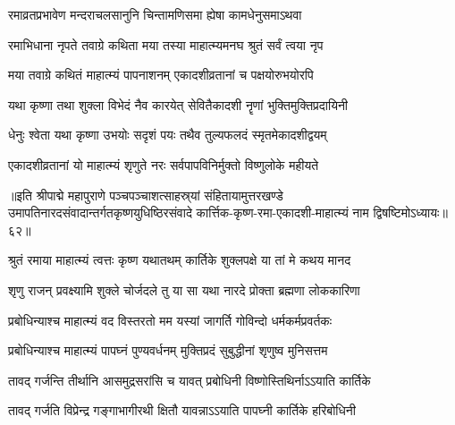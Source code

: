 \twolineshloka
{रमाव्रतप्रभावेण मन्दराचलसानुनि}
{चिन्तामणिसमा ह्येषा कामधेनुसमाऽथवा}%

\twolineshloka
{रमाभिधाना नृपते तवाग्रे कथिता मया}
{तस्या माहात्म्यमनघ श्रुतं सर्वं त्वया नृप}%

\twolineshloka
{मया तवाग्रे कथितं माहात्म्यं पापनाशनम्}
{एकादशीव्रतानां च पक्षयोरुभयोरपि}%

\twolineshloka
{यथा कृष्णा तथा शुक्ला विभेदं नैव कारयेत्}
{सेवितैकादशी नॄणां भुक्तिमुक्तिप्रदायिनी}%

\twolineshloka
{धेनुः श्वेता यथा कृष्णा उभयोः सदृशं पयः}
{तथैव तुल्यफलदं स्मृतमेकादशीद्वयम्}%

\twolineshloka
{एकादशीव्रतानां यो माहात्म्यं शृणुते नरः}
{सर्वपापविनिर्मुक्तो विष्णुलोके महीयते}%

॥इति श्रीपाद्मे महापुराणे पञ्चपञ्चाशत्साहस्र्यां संहितायामुत्तरखण्डे उमापतिनारदसंवादान्तर्गतकृष्णयुधिष्ठिरसंवादे कार्त्तिक-कृष्ण-रमा-एकादशी-माहात्म्यं नाम द्विषष्टिमोऽध्यायः॥६२॥

\genMangalaShloka

\hyperref[sec:ekadashi_mahatmyam_padma_puranam]{\closesub}
\clearpage

\label{sec:padma-karttika-shukla-prabodhini}

\ganapatyadiDhyanam
\padmaPuranam



\twolineshloka
{श्रुतं रमाया माहात्म्यं त्वत्तः कृष्ण यथातथम्}
{कार्तिके शुक्लपक्षे या तां मे कथय मानद}%


\twolineshloka
{शृणु राजन् प्रवक्ष्यामि शुक्ले चोर्जदले तु या}
{सा यथा नारदे प्रोक्ता ब्रह्मणा लोककारिणा}%


\twolineshloka
{प्रबोधिन्याश्च माहात्म्यं वद विस्तरतो मम}
{यस्यां जागर्ति गोविन्दो धर्मकर्मप्रवर्तकः}%


\twolineshloka
{प्रबोधिन्याश्च माहात्म्यं पापघ्नं पुण्यवर्धनम्}
{मुक्तिप्रदं सुबुद्धीनां शृणुष्व मुनिसत्तम}%

\twolineshloka
{तावद् गर्जन्ति तीर्थानि आसमुद्रसरांसि च}
{यावत् प्रबोधिनी विष्णोस्तिथिर्नाऽऽयाति कार्तिके}%

\twolineshloka
{तावद् गर्जति विप्रेन्द्र गङ्गाभागीरथी क्षितौ}
{यावन्नाऽऽयाति पापघ्नी कार्तिके हरिबोधिनी}%

